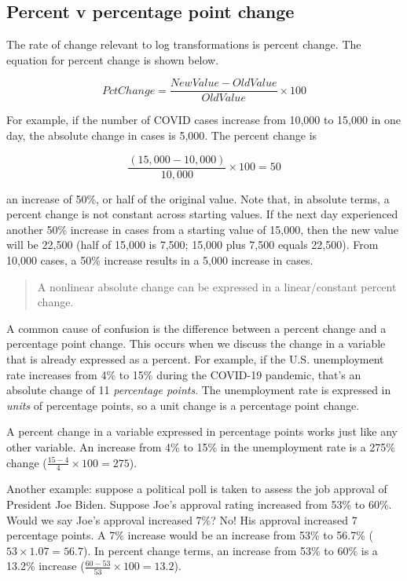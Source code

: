 \documentclass[
]{book}
\begin{document}
\hypertarget{percent-v-percentage-point-change}{%
\subsection{Percent v percentage point change}\label{percent-v-percentage-point-change}}

The rate of change relevant to log transformations is percent change. The equation for percent change is shown below.

\begin{equation}
PctChange = {\frac{NewValue-OldValue}{OldValue}} \times 100
\label{eq:pctchange}
\end{equation}

For example, if the number of COVID cases increase from 10,000 to 15,000 in one day, the absolute change in cases is 5,000. The percent change is

\[\frac{(15,000-10,000)}{10,000} \times 100 = 50\]

an increase of 50\%, or half of the original value. Note that, in absolute terms, a percent change is not constant across starting values. If the next day experienced another 50\% increase in cases from a starting value of 15,000, then the new value will be 22,500 (half of 15,000 is 7,500; 15,000 plus 7,500 equals 22,500). From 10,000 cases, a 50\% increase results in a 5,000 increase in cases.

\begin{quote}
A nonlinear absolute change can be expressed in a linear/constant percent change.
\end{quote}

A common cause of confusion is the difference between a percent change and a percentage point change. This occurs when we discuss the change in a variable that is already expressed as a percent. For example, if the U.S. unemployment rate increases from 4\% to 15\% during the COVID-19 pandemic, that's an absolute change of 11 \emph{percentage points}. The unemployment rate is expressed in \emph{units} of percentage points, so a unit change is a percentage point change.

A percent change in a variable expressed in percentage points works just like any other variable. An increase from 4\% to 15\% in the unemployment rate is a 275\% change (\(\frac{15-4}{4} \times 100 = 275\)).

Another example: suppose a political poll is taken to assess the job approval of President Joe Biden. Suppose Joe's approval rating increased from 53\% to 60\%. Would we say Joe's approval increased 7\%? No! His approval increased 7 percentage points. A 7\% increase would be an increase from 53\% to 56.7\% (\(53 \times 1.07 = 56.7\)). In percent change terms, an increase from 53\% to 60\% is a 13.2\% increase (\(\frac{60-53}{53} \times 100 = 13.2\)).
\end{document}
